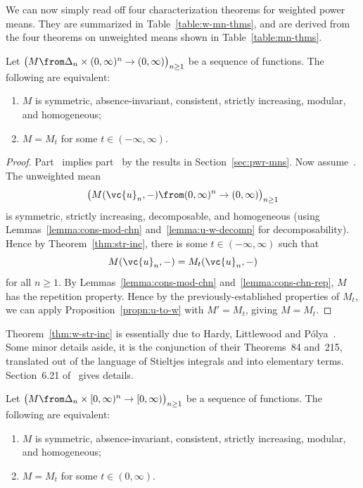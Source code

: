 We can now simply read off four characterization theorems for weighted
power means.  They are summarized in Table~\ref{table:w-mn-thms}, and are
derived from the four theorems on unweighted means shown in
Table~\ref{table:mn-thms}.

\begin{thm}
% 
Let $\bigl( M \from \Delta_n \times (0, \infty)^n \to (0, \infty) \bigr)_{n
  \geq 1}$ be a sequence of functions.  The following are equivalent:
% 
\begin{enumerate}
\item 
{}
$M$ is symmetric, absence-invariant, consistent, strictly increasing,
modular, and homogeneous;

\item
{}
$M = M_t$ for some $t \in (-\infty, \infty)$.
\end{enumerate}
\end{thm}

\begin{proof}
Part~ implies part~
by the results in Section~\ref{sec:pwr-mns}.
Now assume~.
The unweighted mean
\[
\bigl( 
M(\vc{u}_n, -) \from (0, \infty)^n \to (0, \infty)
\bigr)_{n \geq 1}
\]
is symmetric, strictly increasing, decomposable, and homogeneous (using
Lemmas~\ref{lemma:cons-mod-chn} and~\ref{lemma:u-w-decomp} for
decomposability).  Hence by Theorem~\ref{thm:str-inc}, there is some $t \in
(-\infty, \infty)$ such that
\[
M(\vc{u}_n, -) = M_t(\vc{u}_n, -)
\]
for all $n \geq 1$.  By Lemmas~\ref{lemma:cons-mod-chn}
and~\ref{lemma:cons-chn-rep}, $M$ has the repetition property.  Hence by the
previously-established properties of $M_t$, we can apply
Proposition~\ref{propn:u-to-w} with $M' = M_t$, giving $M = M_t$.
\end{proof}

Theorem~\ref{thm:w-str-inc} is essentially due to Hardy,%
%
%
Littlewood%
%
%
and P\'olya~\cite{HLP}.%
%
% 
Some minor details aside, it is the conjunction of
their Theorems~84 and~215, translated out of the language of Stieltjes
integrals and into elementary terms.  Section~6.21 of~\cite{HLP} gives
details.

\begin{thm}
\index{power mean!characterization of!weighted on $[0, \infty)$}
% 
Let $\bigl( M \from \Delta_n \times [0, \infty)^n \to [0, \infty) \bigr)_{n
  \geq 1}$ be a sequence of functions.  The following are equivalent:
% 
\begin{enumerate}
\item 
$M$ is symmetric, absence-invariant, consistent, strictly increasing,
  modular, and homogeneous;

\item
$M = M_t$ for some $t \in (0, \infty)$.
\end{enumerate}
\end{thm}

